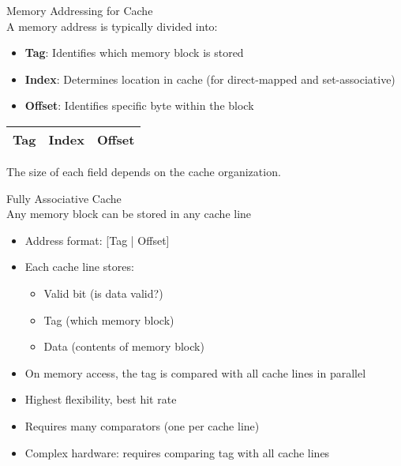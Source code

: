\begin{definition}{Memory Addressing for Cache}\\
A memory address is typically divided into:
\begin{itemize}
    \item \textbf{Tag}: Identifies which memory block is stored
    \item \textbf{Index}: Determines location in cache (for direct-mapped and set-associative)
    \item \textbf{Offset}: Identifies specific byte within the block
\end{itemize}
\begin{center}
\begin{tabular}{|c|c|c|}
\hline
Tag & Index & Offset \\
\hline
\end{tabular}
\end{center}
The size of each field depends on the cache organization.
\end{definition}

\begin{concept}{Fully Associative Cache}\\
    Any memory block can be stored in any cache line
\begin{itemize}
    \item Address format: [Tag | Offset]
    \item Each cache line stores:
    \begin{itemize}
        \item Valid bit (is data valid?)
        \item Tag (which memory block)
        \item Data (contents of memory block)
    \end{itemize}
    \item On memory access, the tag is compared with all cache lines in parallel
    \item Highest flexibility, best hit rate
    \item Requires many comparators (one per cache line)
    \item Complex hardware: requires comparing tag with all cache lines
\end{itemize}
\end{concept}

